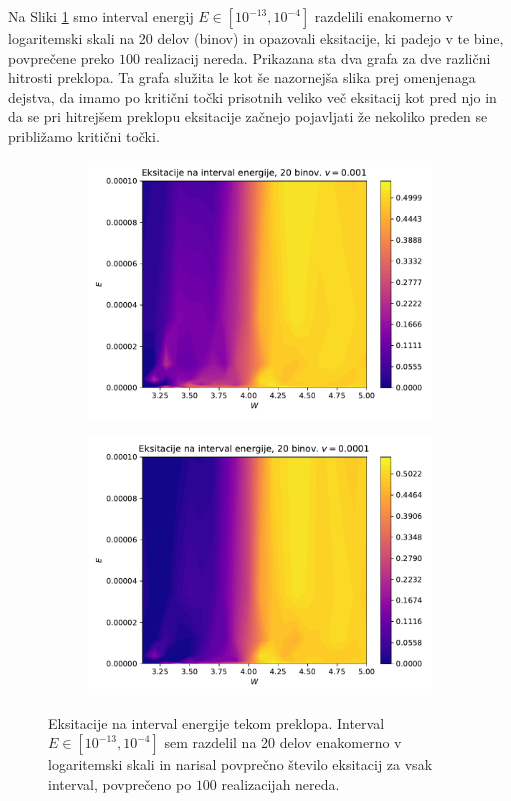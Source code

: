 Na Sliki \ref{fig:EksBini} smo interval energij $E \in [10^{-13},10^{-4}]$ razdelili enakomerno v logaritemski skali na 20 delov (binov) in opazovali eksitacije, ki padejo v te bine, povprečene preko $100$ realizacij nereda. Prikazana sta dva grafa za dve različni hitrosti preklopa. Ta grafa služita le kot še nazornejša slika prej omenjenaga dejstva, da imamo po kritični točki prisotnih veliko več eksitacij kot pred njo in da se pri hitrejšem preklopu eksitacije začnejo pojavljati že nekoliko preden se približamo kritični točki.
\begin{figure}[H]
\centering
\begin{subfigure}{.49\textwidth}
\includegraphics[width=\linewidth]{Figures/EksBini1.pdf}
\end{subfigure}
\begin{subfigure}{.49\textwidth}
\includegraphics[width=\linewidth]{Figures/EksBini2.pdf}
\end{subfigure}
\caption{Eksitacije na interval energije tekom preklopa. Interval $E \in [10^{-13},10^{-4}]$ sem razdelil na 20 delov enakomerno v logaritemski skali in narisal povprečno število eksitacij za vsak interval, povprečeno po $100$ realizacijah nereda.}
\label{fig:EksBini}
\end{figure}
